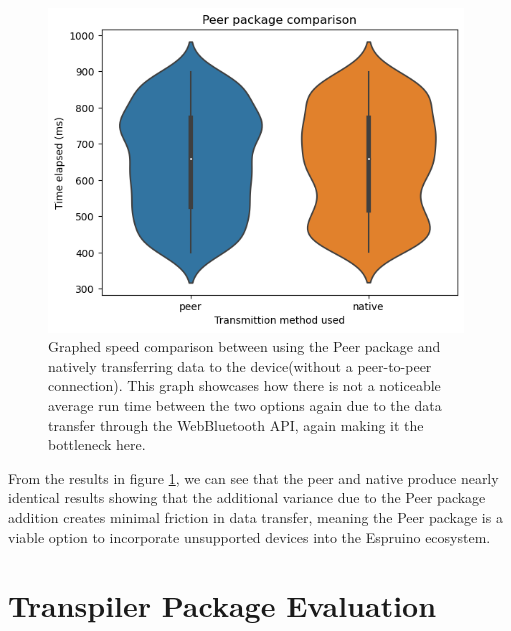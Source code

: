 \documentclass{l4proj}
\begin{document}
\begin{figure}[H]
    \centering
    \includegraphics[width=11cm]{dissertation/images/peer-native-comparison.png}
    \caption{Graphed speed comparison between using the Peer package and natively transferring data to the device(without a peer-to-peer connection). This graph showcases how there is not a noticeable average run time between the two options again due to the data transfer through the WebBluetooth API, again making it the bottleneck here.}
    \label{fig:peer-native-speed-comparison}
\end{figure}

From the results in figure \ref{fig:peer-native-speed-comparison}, we can see that the peer and native produce nearly identical results showing that the additional variance due to the Peer package addition creates minimal friction in data transfer, meaning the Peer package is a viable option to incorporate unsupported devices into the Espruino ecosystem.

\section{Transpiler Package Evaluation}
\end{document}
